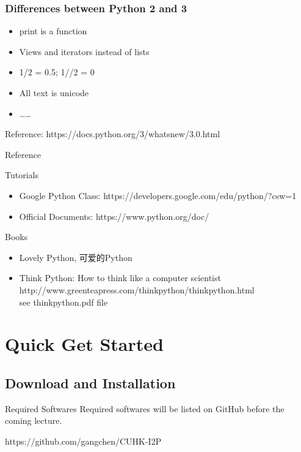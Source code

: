 \documentclass[UTF8]{beamer}
\begin{document}
\begin{frame}
  \frametitle{Differences between Python 2 and 3}
  \begin{itemize}
    \item print is a function
    \item Views and iterators instead of lists
    \item 1/2 = 0.5; 1//2 = 0
    \item All text is unicode
    \item \ldots \ldots
  \end{itemize}
  Reference: https://docs.python.org/3/whatsnew/3.0.html
\end{frame}

\begin{frame}{Reference}
\begin{block}{Tutorials}
\begin{itemize}
  \item Google Python Class: https://developers.google.com/edu/python/?csw=1
  \item Official Documents: https://www.python.org/doc/
\end{itemize}
\end{block}

\begin{block}{Books}
  \begin{itemize}
    \item Lovely Python, 可爱的Python
    \item Think Python: How to think like a computer scientist\\
    http://www.greenteapress.com/thinkpython/thinkpython.html\\
    see thinkpython.pdf file

  \end{itemize}
\end{block}
\end{frame}

\section{Quick Get Started}
\subsection{Download and Installation}
\begin{frame}
\begin{block}{Required Softwares}
  Required softwares will be listed on GitHub before the coming
  lecture.

  https://github.com/gangchen/CUHK-I2P
\end{block}
\end{frame}
\end{document}
